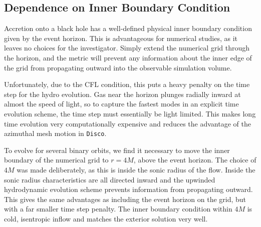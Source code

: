 \documentclass{emulateapj}
\newcommand{\Disco}{{\texttt{Disco}}}
\newcommand{\model}[1]{{Model \texttt{#1}}}
\begin{document}
\begin{figure*}
	\caption{\label{fi:spec} Spectra of \model{1} (blue circles), \model{2} (orange plus signs), and \model{3} (green triangles) at $t = 28 T_\text{bin}$, obtained by integrating over the ray-traced intensity (e.g. in Figure \ref{fi:im}).  Solid lines are Novikov--Thorne spectra with $\dot{M}$ of the inner boundary averaged over $20 T_\text{bin}$ to $29 T_\text{bin}$ for each model.  Only the $R<40M$ region is included in the integration, to remove the effect of truncation at the outer disk edge.  The inclination angle $i=60^\circ$ and the distance $D=1$ kpc.  The data are consistent with the Novikov--Thorne profile at low energies but show a high-energy excess, consistent with the increased shock dissipation and radiative cooling observed at $r\lesssim 10M$.}
\end{figure*}

\subsection{Dependence on Inner Boundary Condition}
\label{subsec:bc}

Accretion onto a black hole has a well-defined physical inner boundary condition given by the event horizon.  This is advantageous for numerical studies, as it leaves no choices for the investigator. Simply extend the numerical grid through the horizon, and the metric will prevent any information about the inner edge of the grid from propagating outward into the observable simulation volume.  

Unfortunately, due to the CFL condition, this puts a heavy penalty on the time step for the hydro evolution.  Gas near the horizon plunges radially inward at almost the speed of light, so to capture the fastest modes in an explicit time evolution scheme, the time step must essentially be light limited. This makes long time evolution very computationally expensive and reduces the advantage of the azimuthal mesh motion in \Disco{}.

To evolve for several binary orbits, we find it necessary to move the inner boundary of the numerical grid to $r=4M$, above the event horizon.  The choice of $4M$ was made deliberately, as this is inside the sonic radius of the flow. Inside the sonic radius characteristics are all directed inward and the upwinded hydrodynamic evolution scheme prevents information from propagating outward.  This gives the same advantages as including the event horizon on the grid, but with a far smaller time step penalty.  The inner boundary condition within $4M$ is cold, isentropic inflow and matches the exterior solution very well.
\end{document}
